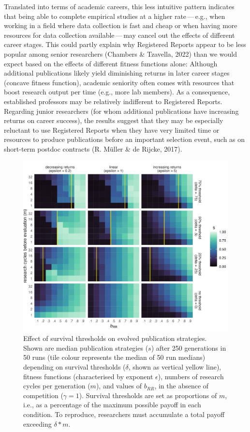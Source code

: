 \documentclass[
  ,man,mask,floatsintext]{apa6}
\begin{document}
Translated into terms of academic careers, this less intuitive pattern indicates that
being able to complete empirical studies at a higher rate\(\,\)---\(\,\)e.g., when working in a field where data collection is fast and cheap or when having more resources for data collection available\(\,\)---\(\,\)may cancel out the effects of different career stages.
This could partly explain why Registered Reports appear to be less popular among senior researchers (Chambers \& Tzavella, 2022) than we would expect based on the effects of different fitness functions alone:
Although additional publications likely yield diminishing returns in later career stages (concave fitness function), academic seniority often comes with resources that boost research output per time (e.g., more lab members).
As a consequence, established professors may be relatively indifferent to Registered Reports.
Regarding junior researchers (for whom additional publications have increasing returns on career success), the results suggest that they may be especially reluctant to use Registered Reports when they have very limited time or resources to produce publications before an important selection event, such as on short-term postdoc contracts (R. Müller \& de Rijcke, 2017).



\begin{figure}
\includegraphics[width=1\linewidth]{plots/plot_delta_tile_evo_epsilon_mako} \caption{Effect of survival thresholds on evolved publication strategies. Shown are median publication strategies (\(s\)) after 250 generations in 50 runs (tile colour represents the median of 50 run medians) depending on survival thresholds (\(\delta\), shown as vertical yellow line), fitness functions (characterised by exponent \(\epsilon\)), numbers of research cycles per generation (\(m\)), and values of \(b_{RR}\), in the absence of competition (\(\gamma = 1\)). Survival thresholds are set as proportions of \(m\), i.e., as a percentage of the maximum possible payoff in each condition. To reproduce, researchers must accumulate a total payoff exceeding \(\delta * m\).}\label{fig:deltaplot}
\end{figure}
\end{document}
